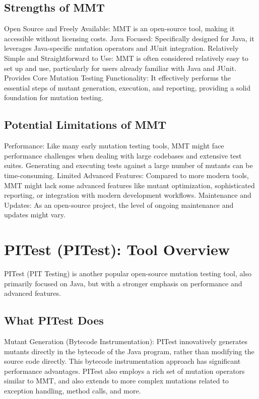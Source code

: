 \documentclass[sigplan, nonacm]{acmart}
\begin{document}
\subsection{Strengths of MMT}

Open Source and Freely Available: MMT is an open-source tool, making it accessible without licensing costs.
Java Focused: Specifically designed for Java, it leverages Java-specific mutation operators and JUnit integration.
Relatively Simple and Straightforward to Use: MMT is often considered relatively easy to set up and use, particularly for users already familiar with Java and JUnit.
Provides Core Mutation Testing Functionality: It effectively performs the essential steps of mutant generation, execution, and reporting, providing a solid foundation for mutation testing.
\subsection{Potential Limitations of MMT}

Performance: Like many early mutation testing tools, MMT might face performance challenges when dealing with large codebases and extensive test suites. Generating and executing tests against a large number of mutants can be time-consuming.
Limited Advanced Features: Compared to more modern tools, MMT might lack some advanced features like mutant optimization, sophisticated reporting, or integration with modern development workflows.
Maintenance and Updates: As an open-source project, the level of ongoing maintenance and updates might vary.
\section{PITest (PITest): Tool Overview}

PITest (PIT Testing) is another popular open-source mutation testing tool, also primarily focused on Java, but with a stronger emphasis on performance and advanced features.

\subsection{What PITest Does}

Mutant Generation (Bytecode Instrumentation): PITest innovatively generates mutants directly in the bytecode of the Java program, rather than modifying the source code directly. This bytecode instrumentation approach has significant performance advantages.  PITest also employs a rich set of mutation operators similar to MMT, and also extends to more complex mutations related to exception handling, method calls, and more.
\end{document}
